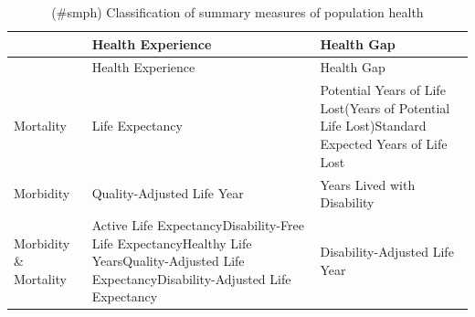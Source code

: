 \documentclass[]{book}
\begin{document}
\begin{longtable}[]{@{}lll@{}}
\caption{(\#smph) Classification of summary measures of population
health}\tabularnewline
\toprule
\begin{minipage}[b]{0.08\columnwidth}\raggedright\strut
\strut
\end{minipage} & \begin{minipage}[b]{0.50\columnwidth}\raggedright\strut
Health Experience\strut
\end{minipage} & \begin{minipage}[b]{0.34\columnwidth}\raggedright\strut
Health Gap\strut
\end{minipage}\tabularnewline
\midrule
\endfirsthead
\toprule
\begin{minipage}[b]{0.08\columnwidth}\raggedright\strut
\strut
\end{minipage} & \begin{minipage}[b]{0.50\columnwidth}\raggedright\strut
Health Experience\strut
\end{minipage} & \begin{minipage}[b]{0.34\columnwidth}\raggedright\strut
Health Gap\strut
\end{minipage}\tabularnewline
\midrule
\endhead
\begin{minipage}[t]{0.08\columnwidth}\raggedright\strut
Mortality\strut
\end{minipage} & \begin{minipage}[t]{0.50\columnwidth}\raggedright\strut
Life Expectancy\strut
\end{minipage} & \begin{minipage}[t]{0.34\columnwidth}\raggedright\strut
Potential Years of Life Lost(Years of Potential Life Lost)Standard
Expected Years of Life Lost\strut
\end{minipage}\tabularnewline
\begin{minipage}[t]{0.08\columnwidth}\raggedright\strut
Morbidity\strut
\end{minipage} & \begin{minipage}[t]{0.50\columnwidth}\raggedright\strut
Quality-Adjusted Life Year\strut
\end{minipage} & \begin{minipage}[t]{0.34\columnwidth}\raggedright\strut
Years Lived with Disability\strut
\end{minipage}\tabularnewline
\begin{minipage}[t]{0.08\columnwidth}\raggedright\strut
Morbidity \& Mortality\strut
\end{minipage} & \begin{minipage}[t]{0.50\columnwidth}\raggedright\strut
Active Life ExpectancyDisability-Free Life ExpectancyHealthy Life
YearsQuality-Adjusted Life ExpectancyDisability-Adjusted Life
Expectancy\strut
\end{minipage} & \begin{minipage}[t]{0.34\columnwidth}\raggedright\strut
Disability-Adjusted Life Year\strut
\end{minipage}\tabularnewline
\bottomrule
\end{longtable}
\end{document}
